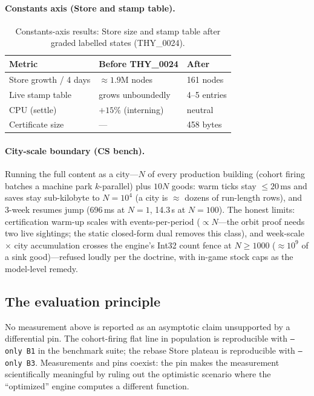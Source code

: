 \documentclass[11pt]{article}
\theoremstyle{remark}
\begin{document}
\paragraph{Constants axis (Store and stamp table).}

\begin{table}[ht]
\centering
\begin{tabular}{@{}lll@{}}
\toprule
Metric                    & Before THY\_0024      & After \\
\midrule
Store growth / 4 days     & $\approx 1.9$M nodes  & 161 nodes \\
Live stamp table          & grows unboundedly     & 4--5 entries \\
CPU (settle)              & $+15\%$ (interning)   & neutral \\
Certificate size          & ---                   & 458 bytes \\
\bottomrule
\end{tabular}
\caption{Constants-axis results: Store size and stamp table after graded labelled
  states (THY\_0024).}
\label{tab:constants-axis}
\end{table}

\paragraph{City-scale boundary (CS bench).} Running the full content as a city---$N$
of every production building (cohort firing batches a machine park $k$-parallel)
plus $10N$ goods: warm ticks stay $\leq 20\,\text{ms}$ and saves stay
sub-kilobyte to $N = 10^4$ (a city is $\approx$ dozens of run-length rows), and
3-week resumes jump (696\,ms at $N = 1$, 14.3\,s at $N = 100$).  The honest
limits: certification warm-up scales with events-per-period ($\propto N$---the
orbit proof needs two live sightings; the static closed-form dual removes this
class), and week-scale $\times$ city accumulation crosses the engine's Int32 count
fence at $N \geq 1000$ ($\approx 10^9$ of a sink good)---refused loudly per the
doctrine, with in-game stock caps as the model-level remedy.

\subsection{The evaluation principle}
\label{sec:eval-principle}

No measurement above is reported as an asymptotic claim unsupported by a
differential pin.  The cohort-firing flat line in population is reproducible with
\texttt{--only B1} in the benchmark suite; the rebase Store plateau is
reproducible with \texttt{--only B3}.  Measurements and pins coexist: the pin
makes the measurement scientifically meaningful by ruling out the optimistic
scenario where the ``optimized'' engine computes a different function.
\end{document}
